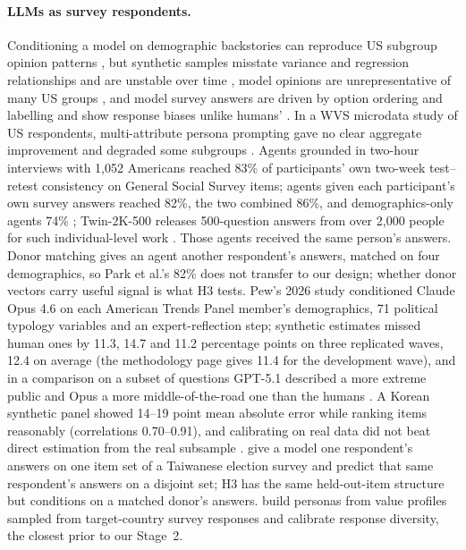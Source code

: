\documentclass[10pt]{article}
\begin{document}
\paragraph{LLMs as survey respondents.} Conditioning a model on demographic backstories can reproduce US subgroup opinion patterns \citep{argyle2023,moon2024}, but synthetic samples misstate variance and regression relationships and are unstable over time \citep{bisbee2024}, model opinions are unrepresentative of many US groups \citep{santurkar2023}, and model survey answers are driven by option ordering and labelling \citep{dominguez2024} and show response biases unlike humans' \citep{tjuatja2024}. In a WVS microdata study of US respondents, multi-attribute persona prompting gave no clear aggregate improvement and degraded some subgroups \citep{tadaymorocho2026}. Agents grounded in two-hour interviews with 1,052 Americans reached 83\% of participants' own two-week test--retest consistency on General Social Survey items; agents given each participant's own survey answers reached 82\%, the two combined 86\%, and demographics-only agents 74\% \citep{park2024}; Twin-2K-500 releases 500-question answers from over 2,000 people for such individual-level work \citep{toubia2025twin}. Those agents received the same person's answers. Donor matching gives an agent another respondent's answers, matched on four demographics, so Park et al.'s 82\% does not transfer to our design; whether donor vectors carry useful signal is what H3 tests. Pew's 2026 study conditioned Claude Opus 4.6 on each American Trends Panel member's demographics, 71 political typology variables and an expert-reflection step; synthetic estimates missed human ones by 11.3, 14.7 and 11.2 percentage points on three replicated waves, 12.4 on average (the methodology page gives 11.4 for the development wave), and in a comparison on a subset of questions GPT-5.1 described a more extreme public and Opus a more middle-of-the-road one than the humans \citep{pew2026silicon}. A Korean synthetic panel showed 14--19 point mean absolute error while ranking items reasonably (correlations 0.70--0.91), and calibrating on real data did not beat direct estimation from the real subsample \citep{kim2026korean}. \citet{ku2026} give a model one respondent's answers on one item set of a Taiwanese election survey and predict that same respondent's answers on a disjoint set; H3 has the same held-out-item structure but conditions on a matched donor's answers. \citet{abels2026} build personas from value profiles sampled from target-country survey responses and calibrate response diversity, the closest prior to our Stage~2.
\end{document}
